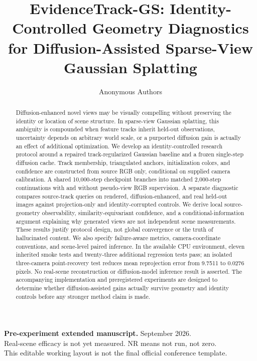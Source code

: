 \documentclass[10pt,twocolumn,letterpaper]{article}
\title{EvidenceTrack-GS: Identity-Controlled Geometry Diagnostics\\for Diffusion-Assisted Sparse-View Gaussian Splatting}
\author{Anonymous Authors}
\date{}
\newcommand{\NR}{\textsf{NR}}
\begin{document}
\maketitle
\begin{center}\small\textbf{Pre-experiment extended manuscript.} September 2026.\\
Real-scene efficacy is not yet measured. \NR{} means not run, not zero.\\
This editable working layout is not the final official conference template.
\end{center}

\begin{abstract}
Diffusion-enhanced novel views may be visually compelling without preserving the identity or location of scene structure. In sparse-view Gaussian splatting, this ambiguity is compounded when feature tracks inherit held-out observations, uncertainty depends on arbitrary world scale, or a purported diffusion gain is actually an effect of additional optimization. We develop an identity-controlled research protocol around a repaired track-regularized Gaussian baseline and a frozen single-step diffusion cache. Track membership, triangulated anchors, initialization colors, and confidence are constructed from source RGB only, conditional on supplied camera calibration. A shared 10,000-step checkpoint branches into matched 2,000-step continuations with and without pseudo-view RGB supervision. A separate diagnostic compares source-track queries on rendered, diffusion-enhanced, and real held-out images against projection-only and identity-corrupted controls. We derive local source-geometry observability, similarity-equivariant confidence, and a conditional-information argument explaining why generated views are not independent scene measurements. These results justify protocol design, not global convergence or the truth of hallucinated content. We also specify failure-aware metrics, camera-coordinate conventions, and scene-level paired inference. In the available CPU environment, eleven inherited smoke tests and twenty-three additional regression tests pass; an isolated three-camera point-recovery test reduces mean reprojection error from 9.7511 to 0.0276 pixels. No real-scene reconstruction or diffusion-model inference result is asserted. The accompanying implementation and preregistered experiments are designed to determine whether diffusion-assisted gains actually survive geometry and identity controls before any stronger method claim is made.
\end{abstract}
\end{document}

